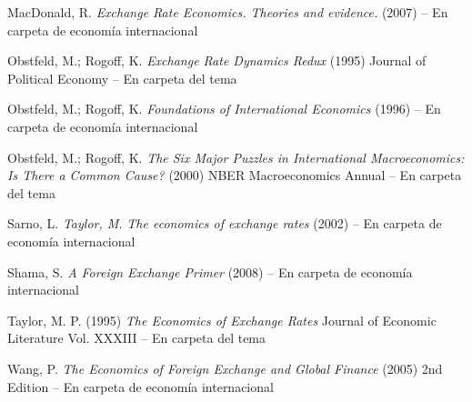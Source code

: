 \documentclass{nuevotema}
\begin{document}
MacDonald, R. \textit{Exchange Rate Economics. Theories and evidence.} (2007) -- En carpeta de economía internacional

Obstfeld, M.; Rogoff, K. \textit{Exchange Rate Dynamics Redux} (1995) Journal of Political Economy -- En carpeta del tema

Obstfeld, M.; Rogoff, K. \textit{Foundations of International Economics} (1996) -- En carpeta de economía internacional

Obstfeld, M.; Rogoff, K. \textit{The Six Major Puzzles in International Macroeconomics: Is There a Common Cause?} (2000) NBER Macroeconomics Annual -- En carpeta del tema

Sarno, L. \textit{Taylor, M.} \textit{The economics of exchange rates} (2002) -- En carpeta de economía internacional

Shama, S. \textit{A Foreign Exchange Primer} (2008) -- En carpeta de economía internacional

Taylor, M. P. (1995) \textit{The Economics of Exchange Rates} Journal of Economic Literature Vol. XXXIII -- En carpeta del tema

Wang, P. \textit{The Economics of Foreign Exchange and Global Finance} (2005) 2nd Edition -- En carpeta de economía internacional
\end{document}
